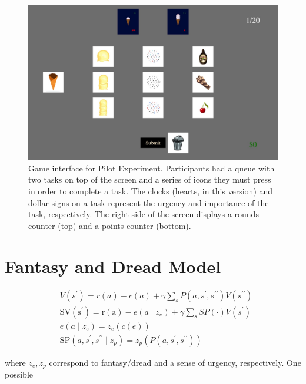 \documentclass[
]{report}
\begin{document}
\begin{figure}

{\centering \includegraphics{images/totalice.jpeg}

}

\caption{Game interface for Pilot Experiment. Participants had a queue
with two tasks on top of the screen and a series of icons they must
press in order to complete a task. The clocks (hearts, in this version)
and dollar signs on a task represent the urgency and importance of the
task, respectively. The right side of the screen displays a rounds
counter (top) and a points counter (bottom).}

\end{figure}

\hypertarget{app-fantasy-dread}{%
\section{Fantasy and Dread Model}\label{app-fantasy-dread}}

\[
\begin{aligned}
& V\left(s^{\prime}\right)=r(a)-c(a)+\gamma \sum_s P\left(a, s^{\prime}, s^{\prime \prime}\right) V\left(s^{\prime \prime}\right) \\
& \mathrm{SV}\left(\mathrm{s}^{\prime}\right)=\mathrm{r}(\mathrm{a})-e\left(a \mid z_e\right)+\gamma \sum_s S P(\cdot) V\left(s^{\prime}\right) \\
& e\left(a \mid z_e\right)=z_e(c(e)) \\
& \mathrm{SP}\left(a, s^{\prime}, s^{\prime \prime} \mid z_p\right)=z_p\left(P\left(a, s^{\prime}, s^{\prime \prime}\right)\right)
\end{aligned}
\]

where \(z_e, z_p\) correspond to fantasy/dread and a sense of urgency,
respectively. One possible
\end{document}

